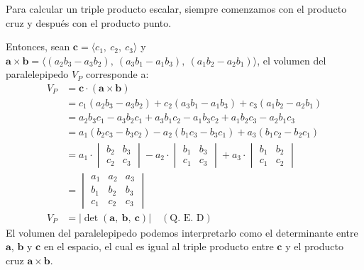 \documentclass[12pt]{article}
\begin{document}
Para calcular un triple producto escalar, siempre comenzamos con el producto cruz y después con el producto punto.

Entonces, sean $\mathbf{c} = \langle c_{1}, \ c_{2}, \ c_{3} \rangle$ y $\mathbf{a} \times \mathbf{b} = \langle (a_{2}b_{3} - a_{3}b_{2}), \ (a_{3}b_{1} - a_{1}b_{3}), \ (a_{1}b_{2} - a_{2}b_{1}) \rangle$, el volumen del paralelepipedo $V_{P}$ corresponde a:
\begin{align*}
V_{P} &= \mathbf{c} \cdot (\mathbf{a} \times \mathbf{b}) \\
      &= c_{1}(a_{2}b_{3} - a_{3}b_{2}) + c_{2}(a_{3}b_{1} - a_{1}b_{3}) + c_{3}(a_{1}b_{2} - a_{2}b_{1}) \\
      &= a_{2}b_{3}c_{1} - a_{3}b_{2}c_{1} + a_{3}b_{1}c_{2} - a_{1}b_{3}c_{2} + a_{1}b_{2}c_{3} - a_{2}b_{1}c_{3} \\
      &= a_{1}(b_{2}c_{3}- b_{3}c_{2}) - a_{2}(b_{1}c_{3} - b_{3}c_{1}) + a_{3}(b_{1}c_{2} - b_{2}c_{1}) \\
      &= a_{1} \cdot
         \begin{vmatrix}
         b_{2} & b_{3} \\
         c_{2} & c_{3}
         \end{vmatrix}
         - a_{2} \cdot
         \begin{vmatrix}
         b_{1} & b_{3} \\
         c_{1} & c_{3}
         \end{vmatrix}
         + a_{3} \cdot
         \begin{vmatrix}
         b_{1} & b_{2} \\
         c_{1} & c_{2}
         \end{vmatrix} \\
      &= \begin{vmatrix}
         a_{1} & a_{2} & a_{3} \\
         b_{1} & b_{2} & b_{3} \\
         c_{1} & c_{2} & c_{3}
         \end{vmatrix} \\
V_{P} &= |\det(\mathbf{a}, \ \mathbf{b}, \ \mathbf{c})| \quad (\text{Q. E. D})
\end{align*}
El volumen del paralelepipedo podemos interpretarlo como el determinante entre $\mathbf{a}$, $\mathbf{b}$ y $\mathbf{c}$ en el espacio, el cual es igual al triple producto entre $\mathbf{c}$ y el producto cruz $\mathbf{a} \times \mathbf{b}$.
\end{document}

